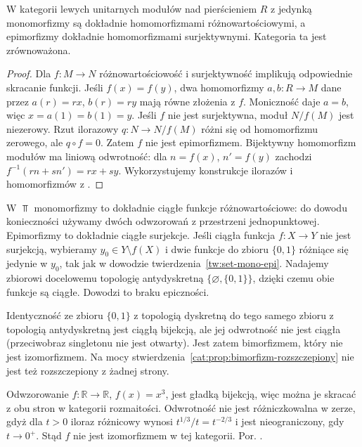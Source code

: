 \begin{twierdzenie}\label{cat:thm:mono-epi-mod}
W kategorii lewych unitarnych modułów nad pierścieniem $R$ z jedynką monomorfizmy są dokładnie homomorfizmami różnowartościowymi, a epimorfizmy dokładnie homomorfizmami surjektywnymi. Kategoria ta jest zrównoważona.
\end{twierdzenie}
\begin{proof}
Dla $f:M\to N$ różnowartościowość i surjektywność implikują odpowiednie skracanie funkcji. Jeśli $f(x)=f(y)$, dwa homomorfizmy $a,b:R\to M$ dane przez $a(r)=rx$, $b(r)=ry$ mają równe złożenia z $f$. Moniczność daje $a=b$, więc $x=a(1)=b(1)=y$. Jeśli $f$ nie jest surjektywna, moduł $N/f(M)$ jest niezerowy. Rzut ilorazowy $q:N\to N/f(M)$ różni się od homomorfizmu zerowego, ale $q\circ f=0$. Zatem $f$ nie jest epimorfizmem. Bijektywny homomorfizm modułów ma liniową odwrotność: dla $n=f(x)$, $n'=f(y)$ zachodzi $f^{-1}(rn+sn')=rx+sy$. Wykorzystujemy konstrukcje ilorazów i homomorfizmów z .
\end{proof}

\begin{przyklad}\label{cat:ex:mono-epi-top}
W $\Top$ monomorfizmy to dokładnie ciągłe funkcje różnowartościowe: do dowodu konieczności używamy dwóch odwzorowań z przestrzeni jednopunktowej. Epimorfizmy to dokładnie ciągłe surjekcje. Jeśli ciągła funkcja $f:X\to Y$ nie jest surjekcją, wybieramy $y_0\in Y\setminus f(X)$ i dwie funkcje do zbioru $\{0,1\}$ różniące się jedynie w $y_0$, tak jak w dowodzie twierdzenia~\ref{tw:set-mono-epi}. Nadajemy zbiorowi docelowemu topologię antydyskretną $\{\varnothing,\{0,1\}\}$, dzięki czemu obie funkcje są ciągłe. Dowodzi to braku epiczności.

Identyczność ze zbioru $\{0,1\}$ z topologią dyskretną do tego samego zbioru z topologią antydyskretną jest ciągłą bijekcją, ale jej odwrotność nie jest ciągła (przeciwobraz singletonu nie jest otwarty). Jest zatem bimorfizmem, który nie jest izomorfizmem. Na mocy stwierdzenia~\ref{cat:prop:bimorfizm-rozszczepiony} nie jest też rozszczepiony z żadnej strony.
\end{przyklad}

\begin{przyklad}\label{cat:ex:smooth-bijection-not-diffeo}
Odwzorowanie $f:\mathbb R\to\mathbb R$, $f(x)=x^3$, jest gładką bijekcją, więc można je skracać z obu stron w kategorii rozmaitości. Odwrotność nie jest różniczkowalna w zerze, gdyż dla $t>0$ iloraz różnicowy wynosi $t^{1/3}/t=t^{-2/3}$ i jest nieograniczony, gdy $t\to0^+$. Stąd $f$ nie jest izomorfizmem w tej kategorii. Por. .
\end{przyklad}

